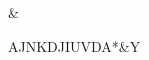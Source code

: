\documentclass{memoir}
\begin{document}
\begin{boxedverbatim}
&%

AJNKDJIUVDA*&Y
\end{boxedverbatim}
\end{document}
